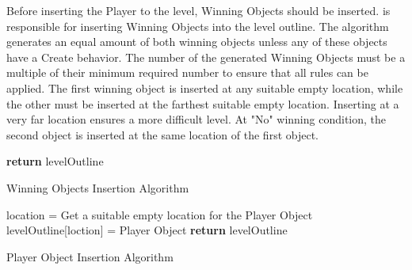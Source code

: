 Before inserting the Player to the level, Winning Objects should be inserted.  is responsible for inserting Winning Objects into the level outline. The algorithm generates an equal amount of both winning objects unless any of these objects have a Create behavior. The number of the generated Winning Objects must be a multiple of their minimum required number to ensure that all rules can be applied. The first winning object is inserted at any suitable empty location, while the other must be inserted at the farthest suitable empty location. Inserting at a very far location ensures a more difficult level. At "No" winning condition, the second object is inserted at the same location of the first object.\\

\begin{algorithm}[H]
	\BlankLine
	\BlankLine
	\BlankLine
	\textbf{return} levelOutline\;
	\caption{Winning Objects Insertion Algorithm}
	\label{Algorithm:winningObjects}
\end{algorithm}

\begin{algorithm}[H]
	\BlankLine
	location = Get a suitable empty location for the Player Object\;
	levelOutline[loction] = Player Object\;
	\BlankLine
	\textbf{return} levelOutline\;
	\caption{Player Object Insertion Algorithm}
	\label{Algorithm:playerObject}
\end{algorithm}

